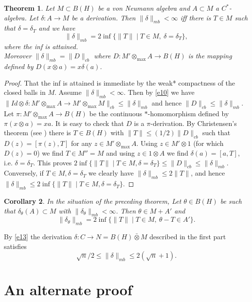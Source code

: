 \documentclass[11pt,leqno]{article}
\theoremstyle{plain}
\newtheorem{thm}{Theorem}[section]
\newtheorem{cor}[thm]{Corollary}
\theoremstyle{definition}
\theoremstyle{remark}
\numberwithin{equation}{section}
\def\d{\delta}
\def\d{\delta}
\begin{document}
     \begin{thm}\label{t2} Let $M\subset B(H)$ be a von Neumann algebra
     and $A\subset M$ a $C^*$-algebra. Let 
  $\d: A \to M$ be a derivation.
  Then $\|\d\|_{mb} <\infty $ iff there is $T\in  M$ such that
  $\d=\d_T$ and we have
  $$\|\d\|_{mb} =2\inf\{ \|T\| \mid T\in  M, \ \d=\d_T\},$$
  where the inf is attained.\\
  Moreover
  $\|\d\|_{mb}=\|D\|_{cb}$ where $D: M' \otimes_{\max} A \to B(H)$ is the 
  mapping   defined by $D(x\otimes a)=x\d(a)$.
 
     \end{thm}
      \begin{proof}  
      That the inf is attained is  immediate
      by the weak* compactness of the closed balls
      in $M$.  Assume $\|\d\|_{mb} <\infty $.
      Then by \eqref{e10} we have
      $\|Id \otimes \d :  M' \otimes_{\max} A \to M' \otimes_{\max} M\|_{cb} \le \|\d\|_{mb}$
      and hence $\|D\|_{cb} \le \|\d\|_{mb}$.
      Let $\pi: M' \otimes_{\max} A \to B(H)$ be the continuous $*$-homomorphism
      defined by $\pi(x\otimes a)=xa $. It is easy to check that
      $D$ is a $\pi$-derivation. By Christensen's theorem (see \cite[p. 96]{95}) 
      there is $T\in B(H)$ with $\|T\|\le (1/2)\|D\|_{cb}$ such that $D(z)=[\pi(z), T]$ for any $z\in
      M' \otimes_{\max} A$. 
      Using $z\in M' \otimes 1$ (for which  $D(z)=0$) we find $T\in M''=M$ and using
      $z\in 1 \otimes A$ we find $\d(a)=[a,T]$, i.e. $\d=\d_T$.
      This proves $2\inf\{\|T\| \mid T\in M, \d=\d_T\} \le  \|D\|_{cb} \le  \|\d\|_{mb}$.
      Conversely, if $T\in M, \d=\d_T$ we clearly have $\|\d\|_{mb} \le 2 \|T\|$,
      and hence $\|\d\|_{mb} \le 2 \inf\{\|T\| \mid T\in M, \d=\d_T\}$.
     \end{proof}
     \def\t{\theta}
     \begin{cor} In the situation of the preceding theorem, 
     Let $\theta \in B(H)$ be such that
     $\d_\t (A) \subset M$ with $ \|\d_\t\|_{mb}  <\infty$. Then
     $\t\in M+A' $ and
     $$\|\d_\t\|_{mb} = 2\inf \{   \|T\| \mid  T\in M, \   \t-T \in A' \}.$$
     \end{cor}
     By \eqref{e13} the derivation $\d: C \to N=B(H) \bar\otimes M$ described in the first part satisfies
     $$   \sqrt n/2\le  \|\d\|_{mb}\le 2 (\sqrt n+1).$$
     \def\D{\Delta}
     
     \section{An alternate proof}
     
\end{document}

